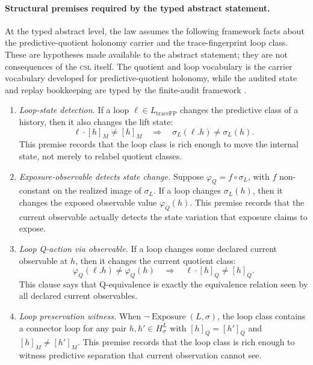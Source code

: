 \documentclass[11pt]{article}
\newcommand{\CSL}{\textsc{csl}}            \newcommand{\CSLcore}{Candidate Structural Law}
\newcommand{\Substrate}{\sigma}             \newcommand{\Lift}{L}                       \newcommand{\LiftState}{\sigma_{L}}         \newcommand{\HistorySpace}{H_{\Substrate}^{\Lift}}
\newcommand{\Qclass}[1]{[#1]_{Q}}
\newcommand{\Mclass}[1]{[#1]_{M}}
\newcommand{\CurrentObservable}{\varphi_{Q}}    \newcommand{\Exposure}{\operatorname{Exposure}}
\newcommand{\TraceFPLoopClass}{L_{\mathrm{traceFP}}}
\newcommand{\LoopActionQ}[2]{#1\cdot\Qclass{#2}}
\newcommand{\LoopActionM}[2]{#1\cdot\Mclass{#2}}
\theoremstyle{definition}
\begin{document}
\paragraph{Structural premises required by the typed abstract statement.}
At the typed abstract level, the law assumes the following framework
facts about the predictive-quotient holonomy carrier and the
trace-fingerprint loop class.  These are hypotheses made available to
the abstract statement; they are not consequences of the \CSL{} itself.
The quotient and loop vocabulary is the carrier vocabulary developed
for predictive-quotient holonomy, while the audited state and replay
bookkeeping are typed by the finite-audit framework
\citep{TsiokosHolonomyMemory2026,TsiokosFoundationsII2026}.
\begin{enumerate}[label=(\alph*)]
  \item \emph{Loop-state detection.}  If a loop
  \(\ell\in\TraceFPLoopClass\) changes the predictive class of a
  history, then it also changes the lift state:
  \[
    \LoopActionM{\ell}{h}\neq\Mclass{h}
    \quad\Longrightarrow\quad
    \LiftState(\ell.h)\neq\LiftState(h).
  \]
  This premise records that the loop class is rich enough to move the
  internal state, not merely to relabel quotient classes.

  \item \emph{Exposure-observable detects state change.}  Suppose
  \(\CurrentObservable=f\circ\LiftState\), with \(f\) non-constant on
  the realized image of \(\LiftState\).  If a loop changes
  \(\LiftState(h)\), then it changes the exposed observable value
  \(\CurrentObservable(h)\).  This premise records that the current
  observable actually detects the state variation that exposure claims
  to expose.

  \item \emph{Loop Q-action via observable.}  If a loop changes some
  declared current observable at \(h\), then it changes the current
  quotient class:
  \[
    \CurrentObservable(\ell.h)\neq\CurrentObservable(h)
    \quad\Longrightarrow\quad
    \LoopActionQ{\ell}{h}\neq\Qclass{h}.
  \]
  This clause says that Q-equivalence is exactly the equivalence
  relation seen by all declared current observables.

  \item \emph{Loop preservation witness.}  When
  \(\neg\Exposure(\Lift,\Substrate)\), the loop class contains a
  connector loop for any pair \(h,h'\in\HistorySpace\) with
  \(\Qclass{h}=\Qclass{h'}\) and
  \(\Mclass{h}\neq\Mclass{h'}\).  This premise records that the loop
  class is rich enough to witness predictive separation that current
  observation cannot see.


\end{enumerate}
\end{document}
